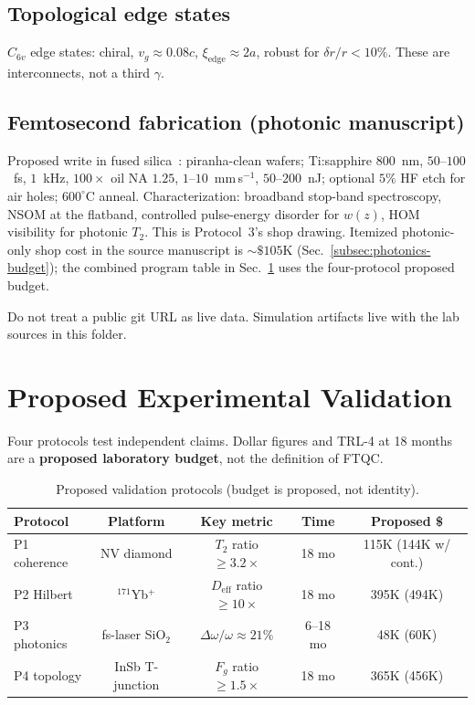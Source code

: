 \documentclass[aps,prx,twocolumn,superscriptaddress,floatfix]{revtex4-2}
\theoremstyle{plain}
\theoremstyle{definition}
\begin{document}
\subsection{Topological edge states}

$C_{6v}$ edge states: chiral, $v_g\approx 0.08c$, $\xi_{\mathrm{edge}}\approx 2a$, robust for $\delta r/r<10\%$. These are interconnects, not a third $\gamma$.

\subsection{Femtosecond fabrication (photonic manuscript)}
\label{subsec:fabrication}

Proposed write in fused silica~\cite{Davis1996,SzameitNolte2010}: piranha-clean wafers; Ti:sapphire $800$~nm, $50$--$100$~fs, $1$~kHz, $100\times$ oil NA $1.25$, $1$--$10$~mm\,s$^{-1}$, $50$--$200$~nJ; optional $5\%$ HF etch for air holes; $600^\circ$C anneal. Characterization: broadband stop-band spectroscopy, NSOM at the flatband, controlled pulse-energy disorder for $w(z)$, HOM visibility for photonic $T_2$. This is Protocol~3's shop drawing. Itemized photonic-only shop cost in the source manuscript is $\sim\$105$K (Sec.~\ref{subsec:photonics-budget}); the combined program table in Sec.~\ref{sec:experiments} uses the four-protocol proposed budget.

Do not treat a public git URL as live data. Simulation artifacts live with the lab sources in this folder.

\section{Proposed Experimental Validation}
\label{sec:experiments}

Four protocols test independent claims. Dollar figures and TRL-4 at 18 months are a \textbf{proposed laboratory budget}, not the definition of FTQC.

\begin{table}[h]
\caption{Proposed validation protocols (budget is proposed, not identity).}
\label{tab:protocols}
\begin{ruledtabular}
\begin{tabular}{lcccc}
Protocol & Platform & Key metric & Time & Proposed \$ \\
\hline
P1 coherence & NV diamond & $T_2$ ratio $\geq 3.2\times$ & 18 mo & 115K (144K w/ cont.) \\
P2 Hilbert & $^{171}$Yb$^+$ & $D_{\mathrm{eff}}$ ratio $\geq 10\times$ & 18 mo & 395K (494K) \\
P3 photonics & fs-laser SiO$_2$ & $\Delta\omega/\omega\approx 21\%$ & 6--18 mo & 48K (60K) \\
P4 topology & InSb T-junction & $F_g$ ratio $\geq 1.5\times$ & 18 mo & 365K (456K) \\
\end{tabular}
\end{ruledtabular}
\end{table}
\end{document}
